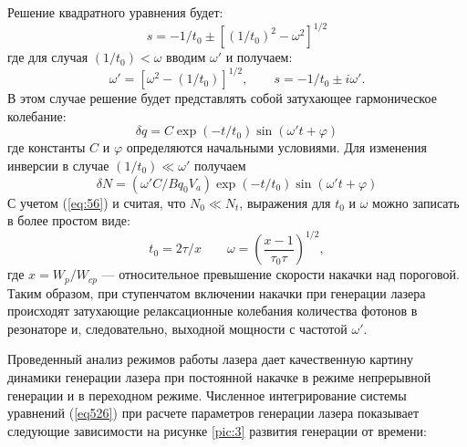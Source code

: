 \documentclass[a4paper, 12pt]{article}
\begin{document}
	Решение квадратного уравнения будет:
	\begin{equation*}
		s=-1/t_0\pm[(1/t_0)^2-\omega^2]^{1/2}
	\end{equation*}
	где для случая $(1/t_0)<\omega$ вводим $\omega'$ и получаем:
	\begin{equation*}
		\omega'=[\omega^2-(1/t_0)]^{1/2},\qquad s=-1/t_0\pm i\omega'.
	\end{equation*}
	В этом случае решение будет представлять собой затухающее гармоническое колебание:
	\begin{equation}
		\delta q=C\exp(-t/t_0)\sin(\omega't+\varphi)
	\end{equation}
	где константы $C$ и $\varphi$ определяются начальными условиями. Для изменения инверсии в случае $(1/t_0)\ll\omega'$ получаем
	\begin{equation*}
		\delta N=(\omega' C/Bq_0V_a)\exp(-t/t_0)\sin(\omega't+\varphi)
	\end{equation*}
	С учетом (\ref{eq:56}) и считая, что $N_0\ll N_t$, выражения для $t_0$ и $\omega$ можно записать в более простом виде:
	\begin{equation}
		t_0=2\tau/x\qquad\omega=\left(\frac{x-1}{\tau_0\tau}\right)^{1/2},
	\end{equation}
	где $x=W_p/W_{cp}$ --- относительное превышение скорости накачки над пороговой. Таким образом, при ступенчатом включении накачки при генерации лазера происходят затухающие релаксационные колебания количества фотонов в резонаторе и, следовательно, выходной мощности с частотой $\omega'$.\par
	Проведенный анализ режимов работы лазера дает качественную картину динамики генерации лазера при постоянной накачке в режиме непрерывной генерации и в переходном режиме. Численное интегрирование системы уравнений (\ref{eq526}) при расчете параметров генерации лазера показывает следующие зависимости на рисунке \ref{pic:3} развития генерации от времени:
\end{document}
